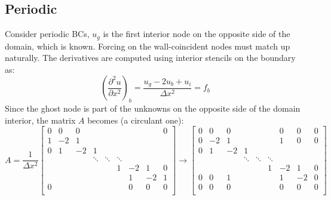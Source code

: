 \documentclass[landscape]{article}
\begin{document}
\subsection{Periodic}
Consider periodic BCs, $u_g$ is the first interior node on the opposite side of the domain, which is known. Forcing on the wall-coincident nodes must match up naturally. The derivatives are computed using interior stencils on the boundary as:
\begin{equation}
   \left(\frac{\partial^2 u}{\partial x^2}\right)_{b} = 
   \frac{u_g - 2 u_b + u_{i}}{\Delta x^2} = f_b
\end{equation}
Since the ghost node is part of the unknowns on the opposite side of the domain interior, the matrix $A$ becomes (a circulant one):
\[ A = \frac{1}{\Delta x^2}
\left[\begin{array}{ccccccccc}
0  & 0     & 0         &           &           &           &           &         &  0 \\
1  & -2    & 1         &           &           &           &           &         &    \\
0  & 1     & -2        & 1         &           &           &           &         &    \\
   &       &           & \ddots    & \ddots    & \ddots    &           &         &    \\
   &       &           &           &           & 1         & -2        & 1       &  0 \\
   &       &           &           &           &           &  1        & -2      &  1 \\
0  &       &           &           &           &           &  0        & 0       &  0 \\
\end{array} \right]
\rightarrow
\left[\begin{array}{ccccccccc}
0  & 0     & 0         &           &           &           &  0        & 0       &  0 \\
0  & -2    & 1         &           &           &           &  1        & 0       &  0 \\
0  & 1     & -2        & 1         &           &           &           &         &    \\
   &       &           & \ddots    & \ddots    & \ddots    &           &         &    \\
   &       &           &           &           & 1         & -2        & 1       &  0 \\
0  & 0     & 1         &           &           &           &  1        & -2      &  0 \\
0  & 0     & 0         &           &           &           &  0        & 0       &  0 \\
\end{array} \right]
\]
\end{document}
